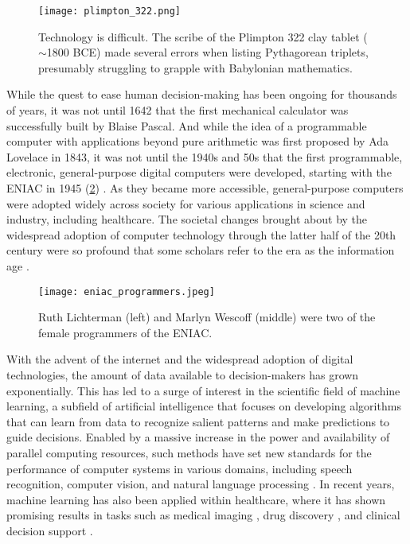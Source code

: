 \begin{figure}[t]
    \centering
    \texttt{[image: plimpton\_322.png]}
    \caption{Technology is difficult. The scribe of the Plimpton 322 clay tablet ($\sim$1800 BCE) made several errors when listing Pythagorean triplets, presumably struggling to grapple with Babylonian mathematics.}
    \label{fig:plimpton_332}
\end{figure}

While the quest to ease human decision-making has been ongoing for thousands of years, it was not until 1642 that the first mechanical calculator was successfully built by Blaise Pascal. 
And while the idea of a programmable computer with applications beyond pure arithmetic was first proposed by Ada Lovelace in 1843, 
it was not until the 1940s and 50s that %
the first programmable, electronic, general-purpose digital computers were developed, starting with the ENIAC in 1945 (\cref{fig:eniac_programmers}) \cite{georges_universal_2001}. 
As they became more accessible, general-purpose computers were adopted widely across society for various applications in science and industry, including healthcare.
The societal changes brought about by the widespread adoption of computer technology through the latter half of the 20th century were so profound that some scholars refer to the era as the information age \cite{georges_universal_2001, harari_sapiens_2011}.

\begin{figure}[t]
    \centering
    \texttt{[image: eniac\_programmers.jpeg]}
    \caption{Ruth Lichterman (left) and Marlyn Wescoff (middle) were two of the female programmers of the ENIAC.} %
    \label{fig:eniac_programmers}
\end{figure}

With the advent of the internet and the widespread adoption of digital technologies, the amount of data available to decision-makers has grown exponentially. 
This has led to a surge of interest in the scientific field of machine learning, a subfield of artificial intelligence that focuses on developing algorithms that can learn from data to recognize salient patterns and make predictions to guide decisions. 
Enabled by a massive increase in the power and availability of parallel computing resources, such methods have set new standards for the performance of computer systems in various domains, including speech recognition, computer vision, and natural language processing \cite{lecun_deep_2015}. 
In recent years, machine learning has also been applied within healthcare, where it has shown promising results in tasks such as medical imaging \cite{lundervold_overview_2019}, drug discovery \cite{chen_rise_2018}, and clinical decision support \cite{cite15, cite14}. 

